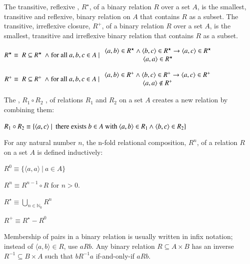 \pn The transitive, reflexive , $R^\star$, of a binary relation $R$ over a set $A$, is the smallest, transitive and reflexive, binary relation on $A$ that contains $R$ as a subset.  The transitive, irreflexive closure, $R^{+}$, 
 of a binary relation $R$ over a set $A$, is the smallest, transitive and irreflexive binary relation that contains $R$ as a subset.
 
\(R^\star \equiv~R \subseteq R^\star~\band~$for all$~a,b,c\in A ~\vert~  
 \begin{array}{c}
 \langle a,b\rangle\in R^\star\wedge\langle b,c\rangle\in R^\star \rightarrow \langle a,c\rangle\in R^\star\\
 \langle a,a\rangle\in R^\star
 \end{array}
 \)
 
\(R^{+} \equiv~R \subseteq R^{+}~\band~$for all$~a,b,c\in A ~\vert~  
 \begin{array}{c}
 \langle a,b\rangle\in R^{+}\wedge\langle b,c\rangle\in R^{+} \rightarrow \langle a,c\rangle\in R^{+}\\
 \langle a,a\rangle\notin R^{+}
 \end{array}
 \)

\pn The , $R_1\circ R_2$
, of relations $R_1$ and $R_2$ on a set $A$ creates a new relation by combining them:

\(R_1\circ R_2 \equiv \{\langle a,c\rangle~\vert~~$there exists$~b\in A~$with$~\langle a,b\rangle\in R_1 \band~\langle b,c\rangle\in R_2\}\)

\pn For any natural number $n$, the n-fold relational composition, $R^{n}$, of a relation $R$ on a set $A$ is defined inductively:

\(R^{0} \equiv \{\langle a,a\rangle~\vert~ a\in A\}\)

\(R^{n} \equiv R^{n\minus 1}\circ R\)
for $n>0$.  

\(R^\star \equiv \bigcup_{n\in \mathbb{N}_0} R^{n}\)

\(R^{+} \equiv R^\star \minus R^{0}\)

\pn Membership of pairs in a binary relation is usually written in infix notation; instead of $\langle a,b\rangle\in R$, use $aRb$.
Any binary relation $R\subseteq A\times B$ has an inverse $R^{\minus1} \subseteq B\times A$ such that 
$b R^{\minus1}a$ if-and-only-if $a R b$.

